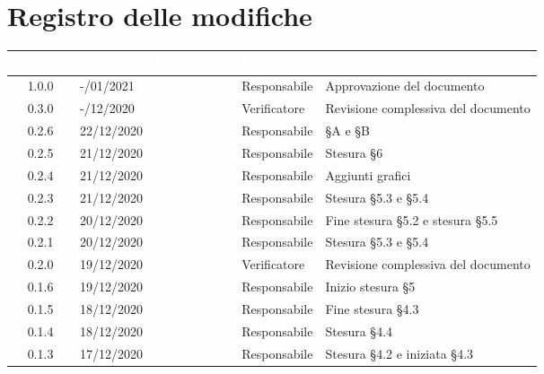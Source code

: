 \section*{Registro delle modifiche}
{
\renewcommand{\arraystretch}{1.5}
\centering
\begin{longtable}{c C{2.6cm} C{3cm} C{2.6cm} C{5cm}}
\textcolor{white}{\textbf{Versione}}&
\textcolor{white}{\textbf{Data}}&
\textcolor{white}{\textbf{Nominativo}}&
\textcolor{white}{\textbf{Ruolo}}&
\textcolor{white}{\textbf{Descrizione}}\\	
\endhead

1.0.0 & -/01/2021 & \SG{} & Responsabile & Approvazione del documento \\

0.3.0 & -/12/2020 & \SH{} & Verificatore & Revisione complessiva del documento \\

0.2.6 & 22/12/2020 & \BM{} & Responsabile & \S A e \S B \\

0.2.5 & 21/12/2020 & \BM{} & Responsabile & Stesura \S 6\\

0.2.4 & 21/12/2020 & \SG{} & Responsabile & Aggiunti grafici \\

0.2.3 & 21/12/2020 & \BM{} & Responsabile & Stesura \S 5.3 e \S 5.4\\

0.2.2 & 20/12/2020 & \SG{} & Responsabile & Fine stesura \S 5.2 e stesura \S 5.5 \\

0.2.1 & 20/12/2020 & \BM{} & Responsabile & Stesura \S 5.3 e \S 5.4\\

0.2.0 & 19/12/2020 & \PA{} & Verificatore & Revisione complessiva del documento \\

0.1.6 & 19/12/2020 & \SG{} & Responsabile & Inizio stesura \S 5 \\

0.1.5 & 18/12/2020 & \BM{} & Responsabile & Fine stesura \S 4.3\\

0.1.4 & 18/12/2020 & \SG{} & Responsabile & Stesura \S 4.4 \\

0.1.3 & 17/12/2020 & \BM{} & Responsabile & Stesura \S 4.2 e iniziata \S 4.3 \\


\end{longtable}}
